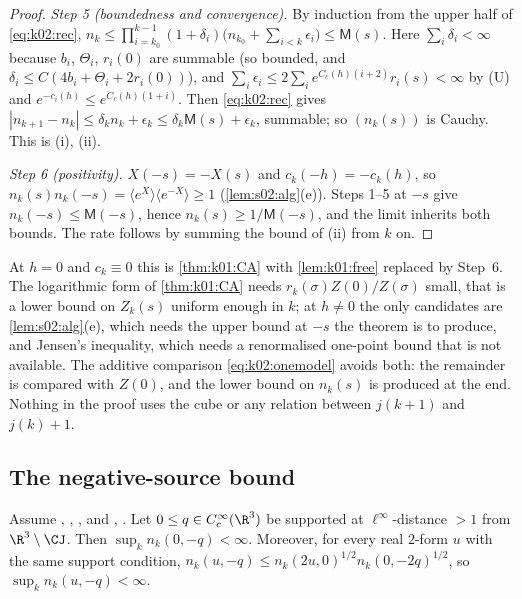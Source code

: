 \begin{proof}
\emph{Step 5 (boundedness and convergence).} By induction from the upper half of \eqref{eq:k02:rec}, $n_k\le\prod_{i=k_0}^{k-1}(1+\delta_i)\big(n_{k_0}+\sum_{i<k}\epsilon_i\big)\le\mathsf M(s)$. Here $\sum_i\delta_i<\infty$ because $b_i$, $\Theta_i$, $r_i(0)$ are summable (so bounded, and $\delta_i\le C(4b_i+\Theta_i+2r_i(0))$), and $\sum_i\epsilon_i\le2\sum_ie^{C_c(h)(i+2)}r_i(s)<\infty$ by (U) and $e^{-c_i(h)}\le e^{C_c(h)(1+i)}$. Then \eqref{eq:k02:rec} gives $|n_{k+1}-n_k|\le\delta_kn_k+\epsilon_k\le\delta_k\mathsf M(s)+\epsilon_k$, summable; so $(n_k(s))$ is Cauchy. This is (i), (ii).

\emph{Step 6 (positivity).} $X(-s)=-X(s)$ and $c_k(-h)=-c_k(h)$, so $n_k(s)n_k(-s)=\langle e^{X}\rangle\langle e^{-X}\rangle\ge1$ (\cref{lem:s02:alg}(e)). Steps 1--5 at $-s$ give $n_k(-s)\le\mathsf M(-s)$, hence $n_k(s)\ge1/\mathsf M(-s)$, and the limit inherits both bounds. The rate follows by summing the bound of (ii) from $k$ on.
\end{proof}

\begin{remark}\label{rem:k02:additive}
At $h=0$ and $c_k\equiv0$ this is \cref{thm:k01:CA} with \cref{lem:k01:free} replaced by Step~6. The logarithmic form of \cref{thm:k01:CA} needs $r_k(\sigma)Z(0)/Z(\sigma)$ small, that is a lower bound on $Z_k(s)$ uniform enough in $k$; at $h\ne0$ the only candidates are \cref{lem:s02:alg}(e), which needs the upper bound at $-s$ the theorem is to produce, and Jensen's inequality, which needs a renormalised one-point bound that is not available. The additive comparison \eqref{eq:k02:onemodel} avoids both: the remainder is compared with $Z(0)$, and the lower bound on $n_k(s)$ is produced at the end. Nothing in the proof uses the cube or any relation between $j(k+1)$ and $j(k)+1$.
\end{remark}

\subsection{The negative-source bound}\label{ssec:k02:UB}

\begin{theorem}\label{thm:k02:UB}
Assume \BALint, \RENorb, \Kh, and \Itwo, \Ithree. Let $0\le q\in C^\infty_c(\R^3)$ be supported at $\ell^\infty$-distance $>1$ from $\R^3\setminus\CJ$. Then $\sup_kn_k(0,-q)<\infty$. Moreover, for every real $2$-form $u$ with the same support condition, $n_k(u,-q)\le n_k(2u,0)^{1/2}n_k(0,-2q)^{1/2}$, so $\sup_kn_k(u,-q)<\infty$.
\end{theorem}

